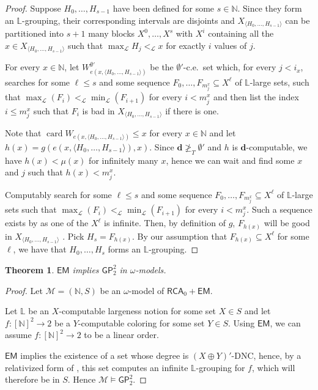 \documentclass{article}
\newtheorem{theorem}{Theorem}
\numberwithin{theorem}{section}
\def\LL{\mathbb{L}}
\def\L{\mathcal{L}}
\def\M{\mathcal{M}}
\newcommand{\dbf}{\mathbf{d}}
\newcommand{\RCA}[0]{\mathsf{RCA}}
\newcommand{\EM}[0]{\mathsf{EM}}
\newcommand{\GP}{\mathsf{GP}}
\newcommand{\NN}[0]{\mathbb{N}}
\newcommand{\card}{\operatorname{card}}
\begin{document}
\begin{proof}
Suppose $H_0, \dots, H_{s-1}$ have been defined for some $s \in \NN$. Since they form an $\LL$-grouping, their corresponding intervals are disjoints and $X_{\langle H_0, \dots, H_{s - 1} \rangle}$ can be partitioned into $s+1$ many blocks $X^0, \dots, X^{s}$ with $X^i$ containing all the $x \in X_{\langle H_0, \dots, H_{s - 1} \rangle}$ such that $\max_{\L} H_j <_\L x$ for exactly $i$ values of $j$.

For every $x \in \NN$, let $W_{e(x,\langle H_0, \dots, H_{s-1} \rangle)}^{\emptyset'}$ be the $\emptyset'$-c.e.\ set which, for every $j < i_x$, searches for some $\ell \leq s$ and some sequence $F_0, \dots, F_{m_j^x} \subseteq X^{\ell}$ of $\LL$-large sets, such that $\max_{\L}(F_i) <_{\L} \min_{\L}(F_{i+1})$ for every $i < m_j^x$ and then list the index $i \leq m_j^x$ such that $F_i$ is bad in $X_{\langle H_0, \dots, H_{s - 1} \rangle}$ if there is one.

Note that $\card W_{e(x,\langle H_0, \dots, H_{s-1} \rangle)} \leq x$ for every $x \in \NN$ and let $h(x) = g(e(x,\langle H_0, \dots, H_{s-1} \rangle), x)$. Since $\dbf \not \geq_T \emptyset'$ and $h$ is $\dbf$-computable, we have $h(x) < \mu(x)$ for infinitely many $x$, hence we can wait and find some $x$ and $j$ such that $h(x) < m_j^x$. 

Computably search for some $\ell \leq s$ and some sequence $F_0, \dots, F_{m_j^x} \subseteq X^{\ell}$ of $\LL$-large sets such that $\max_{\L}(F_i) <_{\L} \min_{\L}(F_{i+1})$ for every $i < m_j^x$. Such a sequence exists by  as one of the $X^{\ell}$ is infinite. Then, by definition of $g$, $F_{h(x)}$ will be good in $X_{\langle H_0, \dots, H_{s - 1} \rangle}$ . Pick $H_s = F_{h(x)}$. By our assumption that $F_{h(x)} \subseteq X^{\ell}$ for some $\ell$, we have that $H_0, \dots, H_s$ forms an $\LL$-grouping.
\end{proof}

\begin{theorem}
    $\EM$ implies $\GP^2_2$ in $\omega$-models.
\end{theorem}

\begin{proof}
Let $\M = (\NN,S)$ be an $\omega$-model of $\RCA_0 + \EM$.

Let $\LL$ be an $X$-computable largeness notion for some set $X \in S$ and let $f : [\NN]^2 \to 2$ be a $Y$-computable coloring for some set $Y \in S$. Using $\EM$, we can assume $f : [\NN]^2 \to 2$ to be a linear order. 

$\EM$ implies the existence of a set whose degree is $(X \oplus Y)'$-DNC, hence, by a relativized form of , this set computes an infinite $\LL$-grouping for $f$, which will therefore be in $S$. Hence $\M \models \GP_2^2$.
\end{proof}
\end{document}
